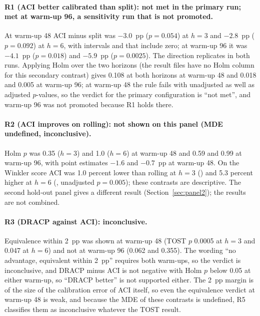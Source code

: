 \begin{table}[t]
\centering
\caption{Primary-family calibration-error contrasts by panel and base model: $T$ (pp of CE), 95\% block-bootstrap interval, Holm-adjusted $p$, minimum detectable difference (MDE) and verdict under the power rule. ``Inconclusive'' with an undefined MDE is not evidence of no effect.}
\label{tab:contrasts}
\small
\fittable{}
\end{table}

\paragraph{R1 (ACI better calibrated than split): not met in the primary run; met at warm-up 96, a sensitivity run that is not promoted.} At warm-up 48 ACI minus split was $-3.0$~pp ($p=0.054$) at $h=3$ and $-2.8$~pp ($p=0.092$) at $h=6$, with intervals  and  that include zero; at warm-up 96 it was $-4.1$~pp ($p=0.018$) and $-5.9$~pp ($p=0.0025$). The direction replicates in both runs. Applying Holm over the two horizons (the result files have no Holm column for this secondary contrast) gives 0.108 at both horizons at warm-up 48 and 0.018 and 0.005 at warm-up 96; at warm-up 48 the rule fails with unadjusted as well as adjusted $p$-values, so the verdict for the primary configuration is ``not met'', and warm-up 96 was not promoted because R1 holds there.

\paragraph{R2 (ACI improves on rolling): not shown on this panel (MDE undefined, inconclusive).} Holm $p$ was 0.35 ($h=3$) and 1.0 ($h=6$) at warm-up 48 and 0.59 and 0.99 at warm-up 96, with point estimates $-1.6$ and $-0.7$~pp at warm-up 48. On the Winkler score ACI was 1.0 percent lower than rolling at $h=3$ () and 5.3 percent higher at $h=6$ (, unadjusted $p=0.005$); these contrasts are descriptive. The second hold-out panel gives a different result (Section~\ref{sec:panel2}); the results are not combined.

\paragraph{R3 (DRACP against ACI): inconclusive.} Equivalence within 2~pp was shown at warm-up 48 (TOST $p$ 0.0005 at $h=3$ and 0.047 at $h=6$) and not at warm-up 96 (0.062 and 0.355). The wording ``no advantage, equivalent within 2~pp'' requires both warm-ups, so the verdict is inconclusive, and DRACP minus ACI is not negative with Holm $p$ below 0.05 at either warm-up, so ``DRACP better'' is not supported either. The 2~pp margin is of the size of the calibration error of ACI itself, so even the equivalence verdict at warm-up 48 is weak, and because the MDE of these contrasts is undefined, R5 classifies them as inconclusive whatever the TOST result.


